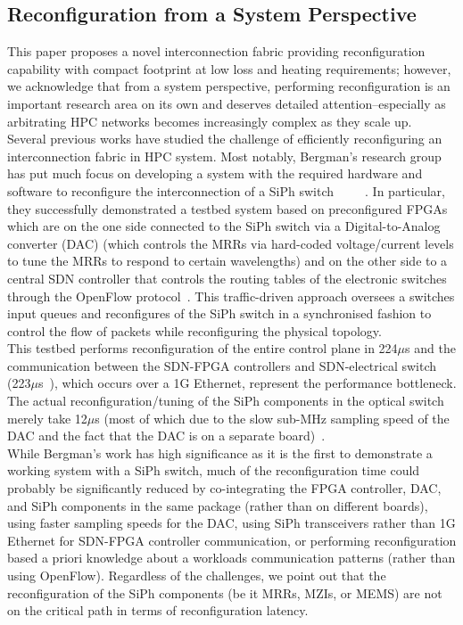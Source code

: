 \subsection{Reconfiguration from a System Perspective}
This paper proposes a novel interconnection fabric providing reconfiguration capability with compact footprint at low loss and heating requirements; however, we acknowledge that from a system perspective, performing reconfiguration is an important research area on its own and deserves detailed attention--especially as arbitrating HPC networks becomes increasingly complex as they scale up. \\
Several previous works have studied the challenge of efficiently reconfiguring an interconnection fabric in HPC system. Most notably, Bergman's research group has put much focus on developing a system with the required hardware and software to reconfigure the interconnection of a SiPh switch~\cite{shen2018software}~\cite{shen2017software}~\cite{shen2018autonomous}~\cite{shen2018accelerating}~\cite{bahadori2018design}. In particular, they successfully demonstrated a testbed system based on preconfigured FPGAs which are on the one side connected to the SiPh switch via a Digital-to-Analog converter (DAC) (which controls the MRRs via hard-coded voltage/current levels to tune the MRRs to respond to certain wavelengths) and on the other side to a central SDN controller that controls the routing tables of the electronic switches through the OpenFlow protocol~\cite{shen2018accelerating}. This traffic-driven approach oversees a switches input queues and reconfigures of the SiPh switch in a synchronised fashion to control the flow of packets while reconfiguring the physical topology. \\
This testbed performs reconfiguration of the entire control plane in 224$\mu$s and the communication between the SDN-FPGA controllers and SDN-electrical switch (223$\mu$s~\cite{shen2018software}), which occurs over a 1G Ethernet, represent the performance bottleneck. The actual reconfiguration/tuning of the SiPh components in the optical switch merely take 12$\mu$s (most of which due to the slow sub-MHz sampling speed of the DAC and the fact that the DAC is on a separate board)~\cite{shen2018software}. \\
While Bergman's work has high significance as it is the first to demonstrate a working system with a SiPh switch, much of the reconfiguration time could probably be significantly reduced by co-integrating the FPGA controller, DAC, and SiPh components in the same package (rather than on different boards), using faster sampling speeds for the DAC, using SiPh transceivers rather than 1G Ethernet for SDN-FPGA controller communication, or performing reconfiguration based a priori knowledge about a workloads communication patterns (rather than using OpenFlow). Regardless of the challenges, we point out that the reconfiguration of the SiPh components (be it MRRs, MZIs, or MEMS) are not on the critical path in terms of reconfiguration latency. 

